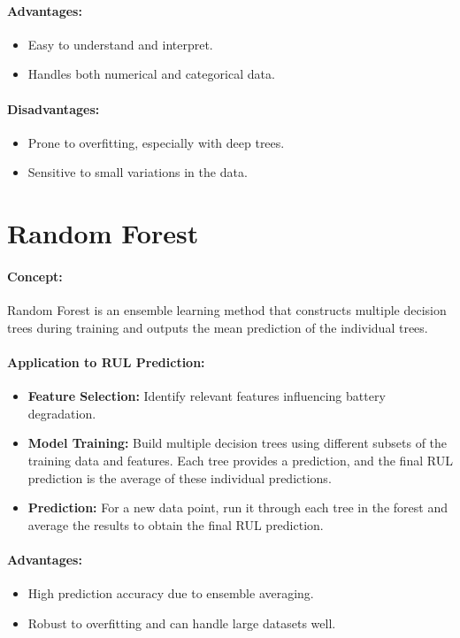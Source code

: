 \paragraph{Advantages:}
\begin{itemize}
    \item Easy to understand and interpret.
    \item Handles both numerical and categorical data.
\end{itemize}
\paragraph{Disadvantages:}
\begin{itemize}
    \item Prone to overfitting, especially with deep trees.
    \item Sensitive to small variations in the data.
\end{itemize}

\section{Random Forest}
\paragraph{Concept:}
Random Forest is an ensemble learning method that constructs multiple decision trees during training and outputs the mean prediction of the individual trees.
\paragraph{Application to RUL Prediction:}
\begin{itemize}
    \item \textbf{Feature Selection:} Identify relevant features influencing battery degradation.
    \item \textbf{Model Training:} Build multiple decision trees using different subsets of the training data and features. Each tree provides a prediction, and the final RUL prediction is the average of these individual predictions.
    \item \textbf{Prediction:} For a new data point, run it through each tree in the forest and average the results to obtain the final RUL prediction.
\end{itemize}
\paragraph{Advantages:}
\begin{itemize}
    \item High prediction accuracy due to ensemble averaging.
    \item Robust to overfitting and can handle large datasets well.
\end{itemize}

